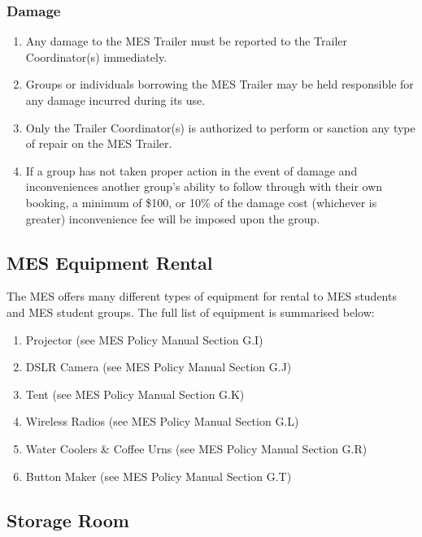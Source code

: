 \hypertarget{damage}{%
 \subsubsection{Damage}
 \label{damage}}

\begin{enumerate}
 \item
  Any damage to the MES Trailer must be reported to the Trailer
  Coordinator(s) immediately.
 \item
  Groups or individuals borrowing the MES Trailer may be held
  responsible for any damage incurred during its use.
 \item
  Only the Trailer Coordinator(s) is authorized to perform or sanction
  any type of repair on the MES Trailer.
 \item
  If a group has not taken proper action in the event of damage and
  inconveniences another group's ability to follow through with their
  own booking, a minimum of \$100, or 10\% of the damage cost (whichever
  is greater) inconvenience fee will be imposed upon the group.

\end{enumerate}

\hypertarget{mes-equipment-rental}{%
 \subsection{MES Equipment Rental}
 \label{mes-equipment-rental}}
The MES offers many different types of equipment for rental to MES
students and MES student groups. The full list of equipment is
summarised below:

\begin{enumerate}
 \item
  Projector (see MES Policy Manual Section G.I)
 \item
  DSLR Camera (see MES Policy Manual Section G.J)
 \item
  Tent (see MES Policy Manual Section G.K)
 \item
  Wireless Radios (see MES Policy Manual Section G.L)
 \item
  Water Coolers \& Coffee Urns (see MES Policy Manual Section G.R)
 \item
  Button Maker (see MES Policy Manual Section G.T)
\end{enumerate}

\hypertarget{storage-room}{%
 \subsection{Storage Room}
 \label{storage-room}}

